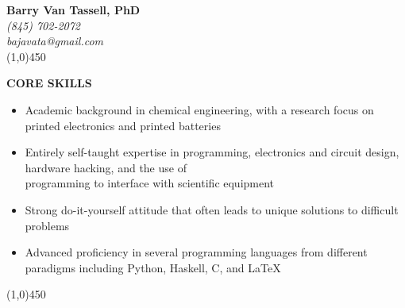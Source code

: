 \documentclass[9pt,letterpaper]{article}
\begin{document}
\begin{center}
  {\LARGE \textbf{Barry Van Tassell, PhD}}\\
  \emph{\small (845) 702-2072\\
    bajavata@gmail.com}\\
  \line(1,0){450}
\end{center}

\onehalfspacing


{\singlespacing
\noindent \textbf{CORE SKILLS}

{\small\begin{itemize}
\item Academic background in chemical engineering, with a research focus on printed electronics and printed batteries
\item Entirely self-taught expertise in programming, electronics and circuit design, hardware hacking, and the use of \\programming to interface with scientific equipment
\item Strong do-it-yourself attitude that often leads to unique solutions to difficult problems
\item Advanced proficiency in several programming languages from different paradigms including Python, Haskell, C, and \LaTeX
\end{itemize}}}

\begin{center}
  \line(1,0){450}
\end{center}
\end{document}
